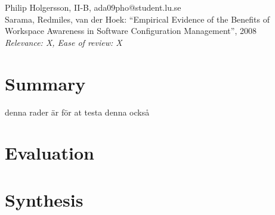 \documentclass[a4paper]{article}
\begin{document}

Philip Holgersson, II-B, ada09pho@student.lu.se\\
Sarama, Redmiles, van der Hoek: ``Empirical Evidence of the Benefits of Workspace Awareness in Software Configuration Management'', 2008 \\
\textit{Relevance: X, Ease of review: X}

\section*{Summary}
denna rader är för at testa
denna också
\section*{Evaluation}



\section*{Synthesis}
\end{document}
